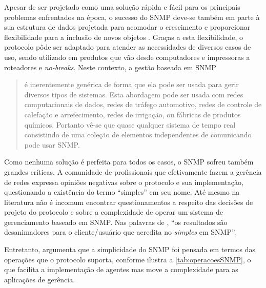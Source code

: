 \documentclass[twoside,english,brazilian]{UNISINOSmonografia}
\begin{document}
Apesar de ser projetado como uma solução rápida e fácil para os principais 
problemas enfrentados na época, o sucesso do SNMP deve-se também em parte à 
sua estrutura de dados projetada para acomodar o crescimento e proporcionar 
flexibilidade para a inclusão de novos objetos \cite{stallings1999snmp}.
Graças a esta flexibilidade, o protocolo pôde ser adaptado para atender as 
necessidades de diversos casos de uso, sendo utilizado em produtos que vão 
desde computadores e impressoras a roteadores e \textit{no-breaks}.
Neste contexto, a gestão baseada em SNMP

\begin{quote}
é inerentemente genérica de forma que ela pode ser usada para gerir diversos 
tipos de sistemas. Esta abordagem pode ser usada com redes computacionais de 
dados, redes de tráfego automotivo, redes de controle de calefação e 
arrefecimento, redes de irrigação, ou fábricas de produtos químicos. Portanto 
vê-se que quase qualquer sistema de tempo real consistindo de uma coleção de 
elementos independentes de comunicando pode usar SNMP.
\cite[p.~2]{perkins1997understanding}
\end{quote}

Como nenhuma solução é perfeita para todos os casos, o SNMP sofreu também 
grandes críticas. 
A comunidade de profissionais que efetivamente fazem a gerência de redes 
expressa opiniões negativas sobre o protocolo e sua implementação, 
questionando a existência do termo ``simples'' em seu nome.
Até mesmo na literatura não é incomum encontrar questionamentos a respeito das 
decisões de projeto do protocolo e sobre a complexidade de operar um sistema 
de gerenciamento baseado em SNMP.
Nas palavras de , ``os resultados são 
desanimadores para o cliente/usuário que acredita no 
\textit{simples} em SNMP''.


Entretanto,  argumenta que a simplicidade do SNMP foi 
pensada em termos das operações que o protocolo suporta, conforme ilustra a 
\autoref{tab:operacoesSNMP}, o que facilita a implementação de agentes mas 
move a complexidade para as aplicações de gerência.
\end{document}

